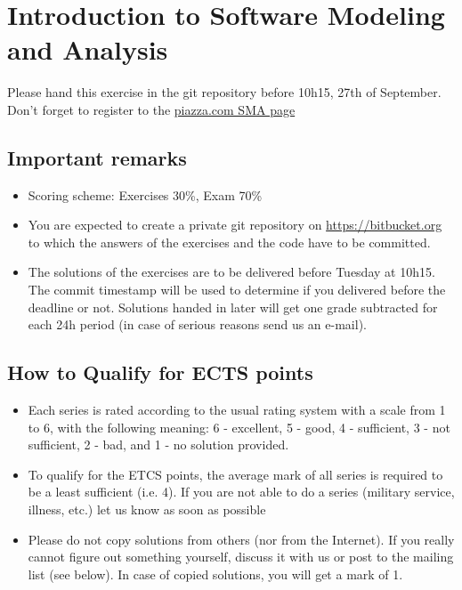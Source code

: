 \documentclass [11pt, a4wide, twoside]{article}
\begin{document}
\section*{Introduction to Software Modeling and Analysis}


Please hand this exercise in the git repository before 10h15, 27th of September.
Don't forget to register to the \href{https://piazza.com/unibe.ch/fall2016/sma21045}{piazza.com SMA page}

\subsection*{Important remarks}

\begin{itemize}
  \item Scoring scheme: Exercises 30\%,  Exam  70\%
  \item You are expected to create a private git repository on \href{https://bitbucket.org}{https://bitbucket.org} to which the
answers of the exercises and the code have to be committed.
  \item The solutions of the exercises are to be delivered before Tuesday at 10h15. The commit timestamp
will be used to determine if you delivered before the deadline or not. Solutions handed in later will
get one grade subtracted for each 24h period (in case of serious reasons send us an e-mail).
\end{itemize}

\subsection*{How to Qualify for ECTS points}

\begin{itemize}
  \item Each series is rated according to the usual rating system with a scale from 1 to 6, with the following
meaning:
6 - excellent, 5 - good, 4 - sufficient, 3 - not sufficient, 2 - bad, and 1 - no solution provided.
  \item To qualify for the ETCS points, the average mark of all series is required to be a least sufficient
	(i.e. 4). If you are not able to do a series (military service, illness, etc.) let us know as soon as
	possible  
\item Please do not copy solutions from others (nor from the Internet). If you really cannot figure out
something yourself, discuss it with us or post to the mailing list (see below). In case of copied
solutions, you will get a mark of 1.
\end{itemize}
\end{document}
